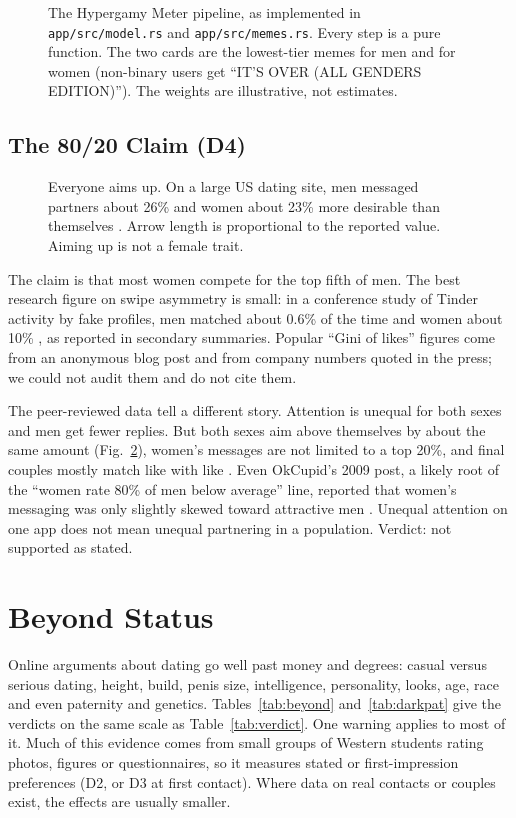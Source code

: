 \documentclass[conference,a4paper]{IEEEtran}
\begin{document}
\begin{figure}[t]
\centering

\caption{The Hypergamy Meter pipeline, as implemented in \texttt{app/src/model.rs} and \texttt{app/src/memes.rs}. Every step is a pure function. The two cards are the lowest-tier memes for men and for women (non-binary users get ``IT'S OVER (ALL GENDERS EDITION)''). The weights are illustrative, not estimates.}
\label{fig:pipeline}
\end{figure}

\subsection{The 80/20 Claim (D4)}
\begin{figure}[t]
\centering

\caption{Everyone aims up. On a large US dating site, men messaged partners about 26\% and women about 23\% more desirable than themselves \cite{bruch2018}. Arrow length is proportional to the reported value. Aiming up is not a female trait.}
\label{fig:aimup}
\end{figure}

The claim is that most women compete for the top fifth of men. The best research figure on swipe asymmetry is small: in a conference study of Tinder activity by fake profiles, men matched about 0.6\% of the time and women about 10\% \cite{tyson2016}, as reported in secondary summaries. Popular ``Gini of likes'' figures come from an anonymous blog post and from company numbers quoted in the press; we could not audit them and do not cite them.

The peer-reviewed data tell a different story. Attention is unequal for both sexes and men get fewer replies. But both sexes aim above themselves by about the same amount (Fig.~\ref{fig:aimup}), women's messages are not limited to a top 20\%, and final couples mostly match like with like \cite{bruch2018,kreager2014}. Even OkCupid's 2009 post, a likely root of the ``women rate 80\% of men below average'' line, reported that women's messaging was only slightly skewed toward attractive men \cite{rudder2009}. Unequal attention on one app does not mean unequal partnering in a population. Verdict: not supported as stated.

\section{Beyond Status}
\label{sec:beyond}
Online arguments about dating go well past money and degrees: casual versus serious dating, height, build, penis size, intelligence, personality, looks, age, race and even paternity and genetics. Tables~\ref{tab:beyond} and~\ref{tab:darkpat} give the verdicts on the same scale as Table~\ref{tab:verdict}. One warning applies to most of it. Much of this evidence comes from small groups of Western students rating photos, figures or questionnaires, so it measures stated or first-impression preferences (D2, or D3 at first contact). Where data on real contacts or couples exist, the effects are usually smaller.
\end{document}
